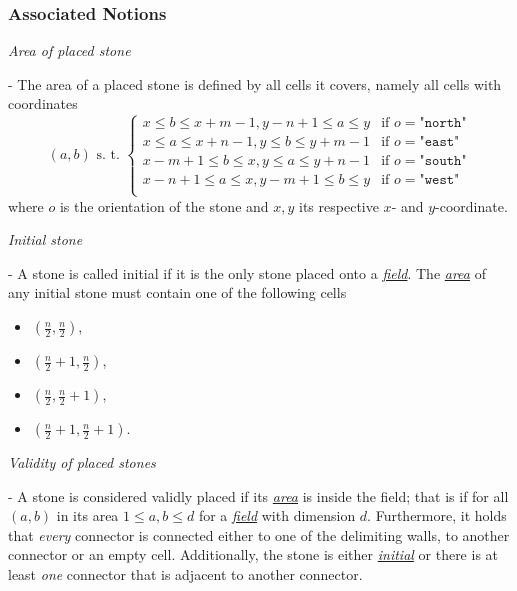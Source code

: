 \documentclass{scrartcl}
\begin{document}
\subsubsection{Associated Notions}
\begin{mdframed}
  \hypertarget{area}{\emph{Area of placed stone}} - The area of a placed stone 
  is defined by all cells it covers, namely all cells with coordinates 
  \begin{equation*}
    (a, b) \text{ s. t. }
    \begin{cases}
      x\leq b\leq x + m - 1, y - n + 1\leq a\leq y &\text{if }o = \texttt{"north"}\\
      x\leq a\leq x + n - 1, y\leq b\leq y + m - 1 &\text{if }o = \texttt{"east"}\\
      x - m + 1\leq b\leq x, y\leq a\leq y + n - 1 &\text{if }o = \texttt{"south"}\\
      x - n + 1\leq a\leq x, y - m + 1\leq b\leq y &\text{if }o = \texttt{"west"}\\
    \end{cases}
  \end{equation*}
  where $o$ is the orientation of the stone and $x, y$ its respective $x$- and
  $y$-coordinate.
\end{mdframed}
\begin{mdframed}
  \hypertarget{initial}{\emph{Initial stone}} - A stone is called initial if it 
  is the only stone placed onto a \hyperlink{field}{\emph{field}}. The 
  \hyperlink{area}{\emph{area}} of any initial stone must contain one of the 
  following cells
  \begin{itemize}
    \item $(\frac{n}{2}, \frac{n}{2})$,
    \item $(\frac{n}{2} + 1, \frac{n}{2})$,
    \item $(\frac{n}{2}, \frac{n}{2} + 1)$,
    \item $(\frac{n}{2} + 1, \frac{n}{2} + 1)$.
  \end{itemize}
\end{mdframed}
\begin{mdframed}
  \hypertarget{valid}{\emph{Validity of placed stones}} - A stone is considered 
  validly placed if its \hyperlink{area}{\emph{area}} is inside the field; that 
  is if for all $(a, b)$ in its area $1\leq a, b\leq d$ for a 
  \hyperlink{field}{\emph{field}} with dimension $d$. Furthermore, it holds 
  that \emph{every} connector is connected either to one of the delimiting 
  walls, to another connector or an empty cell. Additionally, the stone is 
  either \hyperlink{initial}{\emph{initial}} or there is at least \emph{one} 
  connector that is adjacent to another connector.
\end{mdframed}
\end{document}
